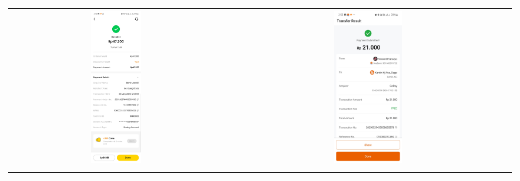 \begin{table}[htbp]
\begin{tabular}{cc}
        \includegraphics[width=0.25\textwidth]{images/contoh-data/qris-3.jpg} & \includegraphics[width=0.25\textwidth]{images/contoh-data/qris-4.jpg} \\
    \end{tabular}
\end{table}

